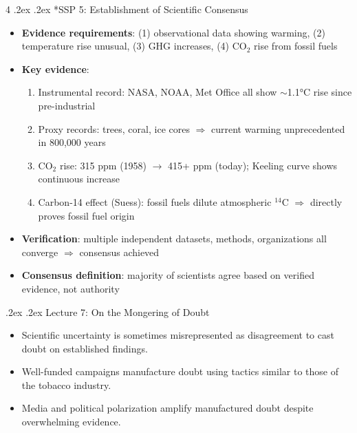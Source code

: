 \documentclass[10pt,landscape,a4paper]{article}
\makeatletter
\renewcommand{\section}{\@startsection{section}{1}{0mm}%
  {.2ex}%
  {.2ex}%
{\color{myblue}\sffamily\small\bfseries}}
\renewcommand{\subsection}{\@startsection{subsection}{1}{0mm}%
  {.2ex}%
  {.2ex}%
{\sffamily\bfseries}}
\makeatother
\begin{document}
\begin{multicols*}{4}
  \subsection*{SSP 5: Establishment of Scientific Consensus}
  \begin{itemize}
    \item \textbf{Evidence requirements}: (1) observational data showing warming, (2) temperature rise unusual, (3) GHG increases, (4) CO$_2$ rise from fossil fuels
    \item \textbf{Key evidence}:
          \begin{enumerate}
            \item Instrumental record: NASA, NOAA, Met Office all show $\sim$1.1°C rise since pre-industrial
            \item Proxy records: trees, coral, ice cores $\Rightarrow$ current warming unprecedented in 800,000 years
            \item CO$_2$ rise: 315 ppm (1958) $\to$ 415+ ppm (today); Keeling curve shows continuous increase
            \item Carbon-14 effect (Suess): fossil fuels dilute atmospheric $^{14}$C $\Rightarrow$ directly proves fossil fuel origin
          \end{enumerate}
    \item \textbf{Verification}: multiple independent datasets, methods, organizations all converge $\Rightarrow$ consensus achieved
    \item \textbf{Consensus definition}: majority of scientists agree based on verified evidence, not authority
  \end{itemize}

  \section{Lecture 7: On the Mongering of Doubt}
  \begin{itemize}
    \item Scientific uncertainty is sometimes misrepresented as disagreement to cast doubt on established findings.
    \item Well-funded campaigns manufacture doubt using tactics similar to those of the tobacco industry.
    \item Media and political polarization amplify manufactured doubt despite overwhelming evidence.
  \end{itemize}


\end{multicols*}
\end{document}
